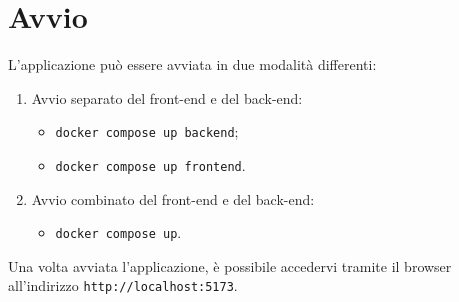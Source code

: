 \section{Avvio}

\par L'applicazione può essere avviata in due modalità differenti:
\begin{enumerate}
  \item Avvio separato del front-end e del back-end:
  \begin{itemize}
    \item \texttt{docker compose up backend};
    \item \texttt{docker compose up frontend}.
  \end{itemize}
  \item Avvio combinato del front-end e del back-end:
  \begin{itemize}
    \item \texttt{docker compose up}.
  \end{itemize}
\end{enumerate}

\vspace{0.5\baselineskip}
\par Una volta avviata l'applicazione, è possibile accedervi tramite il browser all'indirizzo \texttt{http://localhost:5173}.